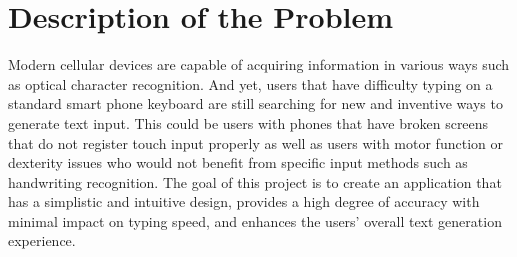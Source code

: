 \documentclass[onecolumn,draftclsnofoot,10pt, journal, letterpaper]{IEEEtran}
\begin{document}
\section{Description of the Problem}
Modern cellular devices are capable of acquiring information in various ways such as optical character recognition. And yet, users that have difficulty typing on a standard smart phone keyboard are still searching for new and inventive ways to generate text input. This could be users with phones that have broken screens that do not register touch input properly as well as users with motor function or dexterity issues who would not benefit from specific input methods such as handwriting recognition. The goal of this project is to create an application that has a simplistic and intuitive design, provides a high degree of accuracy with minimal impact on typing speed, and enhances the users' overall text generation experience. 

\end{document}
